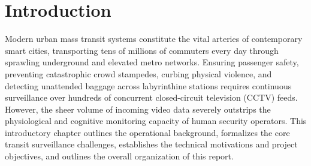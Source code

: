 \documentclass[12pt,a4paper]{report}
\begin{document}

\gdef \title{MULTI-EVENT INCIDENT INTELLIGENCE FRAMEWORK FOR SMART METRO SURVEILLANCE}
\gdef \dept{Artificial Intelligence and Data Science}
\gdef \degree{Bachelor of Technology}
\gdef \branch{Artificial Intelligence and Data Science}
\gdef \college{SREEPATHY INSTITUTE OF MANAGEMENT AND TECHNOLOGY}
\gdef \collegeplace{Vavanoor}
\gdef \studentA{ADITHYA CHANDRAN}
\gdef \studentAroll{SPT23AD006}
\gdef \studentB{AKHIL P}
\gdef \studentBroll{SPT23AD009}
\gdef \studentC{MUHAMMED SHIBIL KP}
\gdef \studentCroll{SPT23AD034}
\gdef \studentD{SHEHRUZ MUHAMMED CS}
\gdef \studentDroll{SPT23AD043}

\gdef \guide{Ms. ARYA N S}
\gdef \guidedes{Assistant Professor}

\gdef \projcordinatorA{Ms. Sreeja P}
\gdef \projcordinatorAdes{Associate Professor}

\gdef \hod{Ms. Sreeja P}
\gdef \hoddes{Associate Professor and Head}

\gdef \acadyear{2026 - 2027}
\gdef \month{October 2026}
\gdef \date{26-10-2026}










\thispagestyle{empty}
\newpage
    
\tableofcontents
\listoffigures
\listoftables


\cleardoublepage
\setcounter{page}{1}

\chapter{Introduction}
\noindent Modern urban mass transit systems constitute the vital arteries of contemporary smart cities, transporting tens of millions of commuters every day through sprawling underground and elevated metro networks. Ensuring passenger safety, preventing catastrophic crowd stampedes, curbing physical violence, and detecting unattended baggage across labyrinthine stations requires continuous surveillance over hundreds of concurrent closed-circuit television (CCTV) feeds. However, the sheer volume of incoming video data severely outstrips the physiological and cognitive monitoring capacity of human security operators. This introductory chapter outlines the operational background, formalizes the core transit surveillance challenges, establishes the technical motivations and project objectives, and outlines the overall organization of this report.
\end{document}
